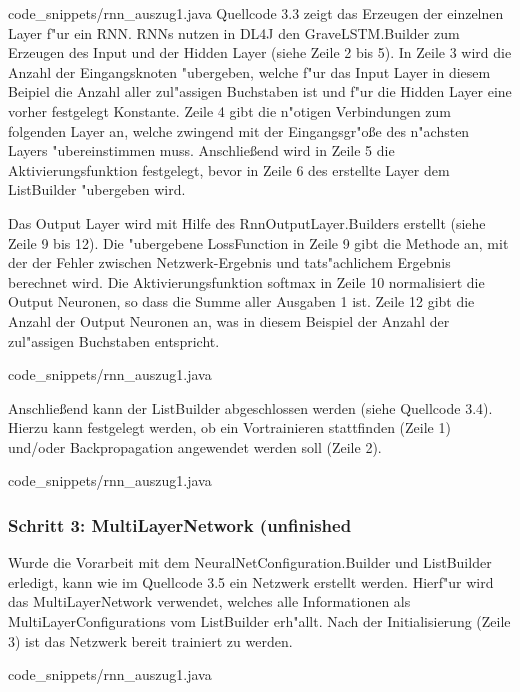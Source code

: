 {
{code_snippets/rnn_auszug1.java}
Quellcode 3.3 zeigt das Erzeugen der einzelnen Layer f"ur ein RNN. RNNs nutzen in DL4J den GraveLSTM.Builder zum Erzeugen des Input und der Hidden Layer (siehe Zeile 2 bis 5). In Zeile 3 wird die Anzahl der Eingangsknoten "ubergeben, welche f"ur das Input Layer in diesem Beipiel die Anzahl aller zul"assigen Buchstaben ist und f"ur die Hidden Layer eine vorher festgelegt Konstante. Zeile 4 gibt die n"otigen Verbindungen zum folgenden Layer an, welche zwingend mit der Eingangsgr"o{\ss}e des n"achsten Layers "ubereinstimmen muss. Anschlie{\ss}end wird in Zeile 5 die Aktivierungsfunktion festgelegt, bevor in Zeile 6 des erstellte Layer dem ListBuilder "ubergeben wird.

Das Output Layer wird mit Hilfe des RnnOutputLayer.Builders erstellt (siehe Zeile 9 bis 12). Die "ubergebene LossFunction in Zeile 9 gibt die Methode an, mit der der Fehler zwischen Netzwerk-Ergebnis und tats"achlichem Ergebnis berechnet wird. Die Aktivierungsfunktion \glqq softmax\grqq{} in Zeile 10 normalisiert die Output Neuronen, so dass die Summe aller Ausgaben 1 ist. Zeile 12 gibt die Anzahl der Output Neuronen an, was in diesem Beispiel der Anzahl der zul"assigen Buchstaben entspricht.


{code_snippets/rnn_auszug1.java}

Anschlie{\ss}end kann der ListBuilder abgeschlossen werden (siehe Quellcode 3.4). Hierzu kann festgelegt werden, ob ein Vortrainieren stattfinden (Zeile 1) und/oder Backpropagation angewendet werden soll (Zeile 2).

{code_snippets/rnn_auszug1.java}

\subsubsection{Schritt 3: MultiLayerNetwork (unfinished}
Wurde die Vorarbeit mit dem NeuralNetConfiguration.Builder und ListBuilder erledigt, kann wie im Quellcode 3.5 ein Netzwerk erstellt werden. Hierf"ur wird das MultiLayerNetwork verwendet, welches alle Informationen als MultiLayerConfigurations vom ListBuilder erh"allt. Nach der Initialisierung (Zeile 3) ist das Netzwerk bereit trainiert zu werden.

{code_snippets/rnn_auszug1.java}

}

